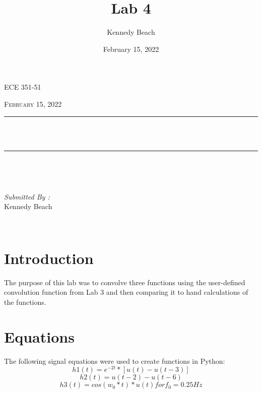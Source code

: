 \documentclass[12pt]{report}
\title{Lab 4}
\author{Kennedy Beach}
\date{February 15, 2022}
\makeatletter
\let\thetitle\@title
\makeatother
\begin{document}
\begin{titlepage}
\centering
\vspace*{0.5 cm}
\begin{center}    \textsc{\Large   ECE 351-51 }\\[2.0 cm]
\end{center}%
\textsc{\Large February 15, 2022}\\[0.5 cm] %
\rule{\linewidth}{0.2 mm} \\[0.4 cm]
{ \huge \bfseries \thetitle}\\
\rule{\linewidth}{0.2 mm} \\[1.5 cm]
\begin{minipage}{0.4\textwidth}
\begin{flushleft} \large
\end{flushleft}
\end{minipage}~
\begin{minipage}{0.4\textwidth}
\begin{flushright} \large
\emph{Submitted By :} \\
Kennedy Beach
\end{flushright}
\end{minipage}\\[2 cm]
\end{titlepage}
\tableofcontents
\pagebreak
\renewcommand{\thesection}{\arabic{section}}
\section{Introduction}
The purpose of this lab was to convolve three functions using the user-defined convolution function from Lab 3 and then comparing it to hand calculations of the functions.

\section{Equations}
The following signal equations were used to create functions in Python:
\begin{equation*}
h1(t) = e^{-2t}*[u(t) - u(t-3)]
\end{equation*}
\begin{equation*}
h2(t) = u(t-2) - u(t-6)
\end{equation*}
\begin{equation*}
h3(t) = cos(w_0*t)*u(t) for f_0 = 0.25Hz
\end{equation*}
\end{document}
